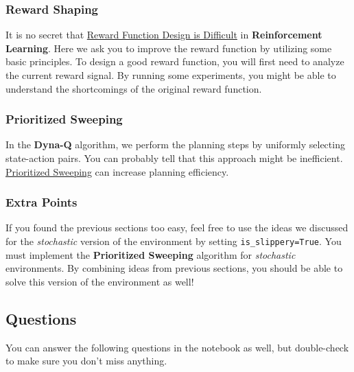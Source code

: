 \subsubsection{Reward Shaping} 
It is no secret that \href{https://www.alexirpan.com/2018/02/14/rl-hard.html#reward-function-design-is-difficult}{Reward Function Design is Difficult} in \textbf{Reinforcement Learning}. 
Here we ask you to improve the reward function by utilizing some basic principles. 
To design a good reward function, you will first need to analyze the current reward signal. 
By running some experiments, you might be able to understand the shortcomings of the original reward function.

\subsubsection{Prioritized Sweeping} 
In the \textbf{Dyna-Q} algorithm, we perform the planning steps by uniformly selecting state-action pairs. 
You can probably tell that this approach might be inefficient. \href{http://incompleteideas.net/book/ebook/node98.html}{Prioritized Sweeping} can increase planning efficiency.

\subsubsection{Extra Points} 
If you found the previous sections too easy, feel free to use the ideas we discussed for the \textit{stochastic} version of the environment by setting \texttt{is\_slippery=True}. 
You must implement the \textbf{Prioritized Sweeping} algorithm for \textit{stochastic} environments. 
By combining ideas from previous sections, you should be able to solve this version of the environment as well!

\subsection{Questions}\label{sec:dyna-questions} 
You can answer the following questions in the notebook as well, but double-check to make sure you don't miss anything.

